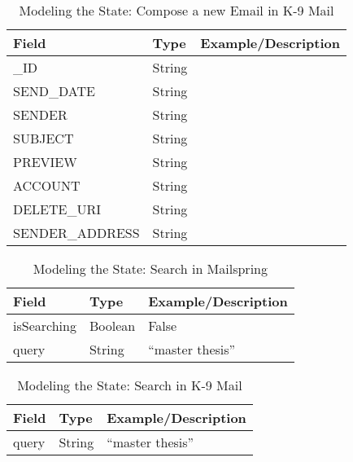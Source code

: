 \begin{table}[ht!]
\begin{tabular}{lll}
Field     & Type      & Example/Description \\
\hline
\_ID            & String &  \\
SEND\_DATE      & String     &                     \\
SENDER         &  String    &                     \\
SUBJECT        &  String    &                     \\
PREVIEW        &  String    &                     \\
ACCOUNT        &   String   &                     \\
DELETE\_URI     &  String    &                     \\
SENDER\_ADDRESS &   String   &                    
\end{tabular}
\caption{Modeling the State: Compose a new Email in K-9 Mail}
\label{tab:compose_new_email_k9}
\end{table}


\begin{table}[ht!]
\begin{tabular}{lll}
Field       & Type    & Example/Description \\
\hline
isSearching & Boolean & False               \\
query       & String  & “master   thesis”  
\end{tabular}
\caption{Modeling the State: Search in Mailspring}
\label{tab:search_mailspring}
\end{table}


\begin{table}[ht!]
\begin{tabular}{lll}
Field & Type   & Example/Description \\
\hline
query & String & “master thesis”    
\end{tabular}
\caption{Modeling the State: Search in K-9 Mail}
\label{tab:search-k9}
\end{table}

